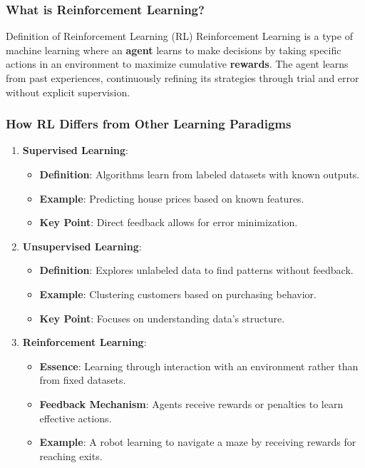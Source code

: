 \documentclass[aspectratio=169]{beamer}
\begin{document}
\begin{frame}[fragile]
    \frametitle{What is Reinforcement Learning?}
    \begin{block}{Definition of Reinforcement Learning (RL)}
        Reinforcement Learning is a type of machine learning where an \textbf{agent} learns to make decisions by taking specific actions in an environment to maximize cumulative \textbf{rewards}. 
        The agent learns from past experiences, continuously refining its strategies through trial and error without explicit supervision.
    \end{block}
\end{frame}

\begin{frame}[fragile]
    \frametitle{How RL Differs from Other Learning Paradigms}
    \begin{enumerate}
        \item \textbf{Supervised Learning}:
            \begin{itemize}
                \item \textbf{Definition}: Algorithms learn from labeled datasets with known outputs.
                \item \textbf{Example}: Predicting house prices based on known features.
                \item \textbf{Key Point}: Direct feedback allows for error minimization.
            \end{itemize}
        \item \textbf{Unsupervised Learning}:
            \begin{itemize}
                \item \textbf{Definition}: Explores unlabeled data to find patterns without feedback.
                \item \textbf{Example}: Clustering customers based on purchasing behavior.
                \item \textbf{Key Point}: Focuses on understanding data's structure.
            \end{itemize}
        \item \textbf{Reinforcement Learning}:
            \begin{itemize}
                \item \textbf{Essence}: Learning through interaction with an environment rather than from fixed datasets.
                \item \textbf{Feedback Mechanism}: Agents receive rewards or penalties to learn effective actions.
                \item \textbf{Example}: A robot learning to navigate a maze by receiving rewards for reaching exits.
            \end{itemize}
    \end{enumerate}
\end{frame}
\end{document}
